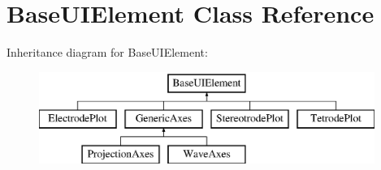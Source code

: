 \hypertarget{classBaseUIElement}{\section{Base\-U\-I\-Element Class Reference}
\label{classBaseUIElement}
}
Inheritance diagram for Base\-U\-I\-Element\-:\begin{figure}[H]
\begin{center}
\leavevmode
\includegraphics[height=3.000000cm]{classBaseUIElement}
\end{center}
\end{figure}
